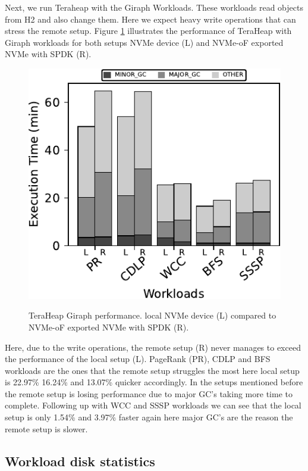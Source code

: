 Next, we run Teraheap with the Giraph Workloads. These workloads read objects from H2 and also change them. Here we expect heavy write operations that can stress the remote setup. Figure \ref{fig:bench_giraph} illustrates the performance of TeraHeap with Giraph workloads for both setups NVMe device (L) and NVMe-oF exported NVMe with SPDK (R).
\begin{figure}[H]
  \includegraphics[width=\linewidth]{figures/bench_giraph.pdf}\\
\caption{TeraHeap Giraph performance. local NVMe device (L) compared to NVMe-oF exported NVMe with SPDK (R).}
\label{fig:bench_giraph}
\end{figure}
Here, due to the write operations, the remote setup (R) never manages to exceed the performance of the local setup (L). PageRank (PR), CDLP and BFS workloads are the ones that the remote setup struggles the most here local setup is 22.97\% 16.24\% and 13.07\% quicker accordingly. In the setups mentioned before the remote setup is losing performance due to major GC's taking more time to complete. Following up with WCC and SSSP workloads we can see that the local setup is only 1.54\%	and 3.97\% faster again here major GC's are the reason the remote setup is slower.

\subsection{Workload disk statistics}

